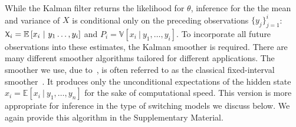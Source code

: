 \documentclass[12pt]{article}
\renewcommand{\hat}{\widehat}
\DeclareRobustCommand{\varx}{{\mathpalette\irchi\relax}}
\newcommand{\irchi}[2]{\protect\raisebox{\depth}{$#1\upchi$}}
\newcommand{\given}{\ \vert\ }
\newcommand{\E}{\mathbb{E}}
\newcommand{\Expect}[1]{\E\left[#1\right]}
\newcommand{\Var}[1]{\mathbb{V}\left[#1\right]}
\begin{document}

While the Kalman filter %
returns the likelihood for $\theta$, 
inference for the the mean and variance
of $X$ is conditional only on the preceding observations
$\{y_j\}_{j=1}^i$: $\varx_i=\Expect{x_i\given y_1\ldots,y_i}$ and
$P_i=\Var{x_i\given y_1,\ldots,y_i}$. To
incorporate all future observations into these estimates, the Kalman
smoother is required.
There are many different smoother algorithms tailored for different
applications. %
The smoother we use, due
to~\citet{RauchStriebel1965}, is often referred to as the classical
fixed-interval smoother~\citep{AndersonMoore1979}. It produces only
the unconditional expectations of the hidden state
$\hat{x}_i=\Expect{x_i\given y_1,\ldots,y_n}$ for the sake of
computational speed. This version is more appropriate for inference in
the type of switching models we discuss below. We again provide this
algorithm in the Supplementary Material.
\end{document}
